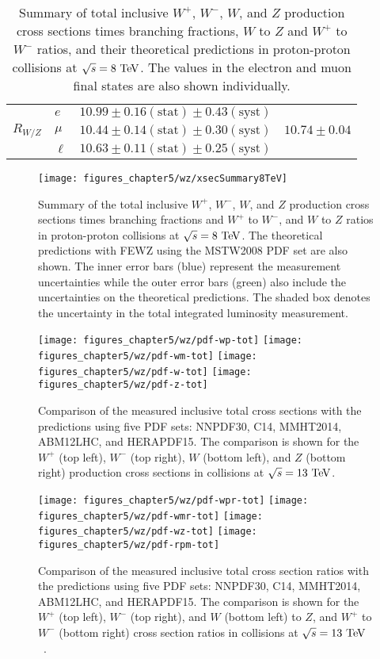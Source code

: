 \begin{table}[tbhp]
\begin {tabular} {lllr}
\hline
             & $e$   & $10.99 \pm 0.16\mathrm{(stat)}\pm 0.43\mathrm{(syst)}$ &                  \\
$R_{W/Z}$   & $\mu$ & $10.44 \pm 0.14\mathrm{(stat)}\pm 0.30\mathrm{(syst)}$ & $10.74 \pm 0.04$ \\
             & $\ell$ & $10.63 \pm 0.11\mathrm{(stat)}\pm 0.25\mathrm{(syst)}$ &  \\
\end{tabular}
\caption{ \label{tab:8tevtable}
Summary of total inclusive $W^{+}$, $W^{-}$, $W$, and $Z$ production cross sections times
branching fractions, $W$ to $Z$ and $W^{+}$ to $W^{-}$ ratios, and their theoretical predictions in proton-proton collisions at $\sqrt{s}=8~\mathrm{Te\kern -0.1em V}$. The values in the electron and muon final states are also shown individually.}
\end{table}
\begin{figure}[tbh]
\centering
\texttt{[image: figures\_chapter5/wz/xsecSummary8TeV]}
\caption{Summary of the total inclusive $W^+$, $W^-$, $W$, and $Z$ production cross sections times branching fractions and $W^+$ to $W^-$, and $W$ to $Z$ ratios in proton-proton collisions at $\sqrt{s}=8~\mathrm{Te\kern -0.1em V}$. The theoretical predictions with FEWZ using the MSTW2008 PDF set are also shown. The inner error bars (blue) represent the measurement uncertainties while the outer error bars (green) also include the uncertainties on the theoretical predictions. The shaded box denotes the uncertainty in the total integrated luminosity measurement.}
\label{fig:8tev}
\end{figure}
\begin{figure}[tbh]
\centering
\texttt{[image: figures\_chapter5/wz/pdf-wp-tot]}
\texttt{[image: figures\_chapter5/wz/pdf-wm-tot]}
\texttt{[image: figures\_chapter5/wz/pdf-w-tot]}
\texttt{[image: figures\_chapter5/wz/pdf-z-tot]}
\caption{Comparison of the measured inclusive total cross sections with the predictions using five PDF sets: NNPDF30, C14, MMHT2014, ABM12LHC, and HERAPDF15. The comparison is shown for the $W^+$ (top left), $W^-$ (top right), $W$ (bottom left), and $Z$ (bottom right) production cross sections in collisions at $\sqrt{s}=13~\mathrm{Te\kern -0.1em V}$.}
\label{fig:pdf_tot}
\end{figure}
\begin{figure}[tbh]
\centering
\texttt{[image: figures\_chapter5/wz/pdf-wpr-tot]}
\texttt{[image: figures\_chapter5/wz/pdf-wmr-tot]}
\texttt{[image: figures\_chapter5/wz/pdf-wz-tot]}
\texttt{[image: figures\_chapter5/wz/pdf-rpm-tot]}
\caption{Comparison of the measured inclusive total cross section ratios with the predictions using five PDF sets: NNPDF30, C14, MMHT2014, ABM12LHC, and HERAPDF15. The comparison is shown for the $W^+$ (top left), $W^-$ (top right), and $W$ (bottom left) to $Z$, and $W^+$ to $W^-$ (bottom right) cross section ratios in collisions at $\sqrt{s}=13~\mathrm{Te\kern -0.1em V}$~\cite{CMS-PAS-SMP-15-004}.}
\label{fig:pdf_rat}
\end{figure}

